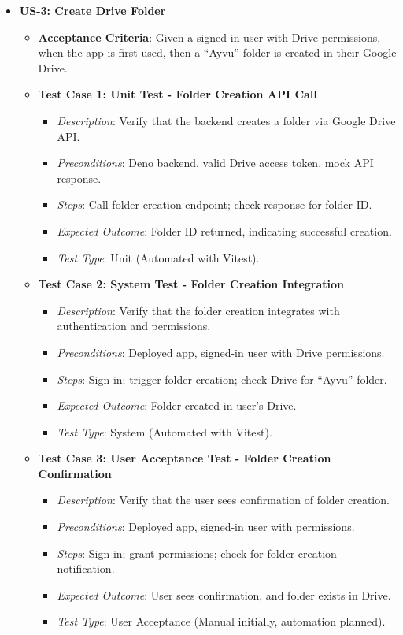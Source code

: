 \documentclass[12pt]{article}
\begin{document}
\begin{itemize}
  \item \textbf{US-3: Create Drive Folder}
    \begin{itemize}
      \item \textbf{Acceptance Criteria}: Given a signed-in user with Drive permissions, when the app is first used, then a ``Ayvu'' folder is created in their Google Drive.
      \item \textbf{Test Case 1: Unit Test - Folder Creation API Call}
        \begin{itemize}
          \item \textit{Description}: Verify that the backend creates a folder via Google Drive API.
          \item \textit{Preconditions}: Deno backend, valid Drive access token, mock API response.
          \item \textit{Steps}: Call folder creation endpoint; check response for folder ID.
          \item \textit{Expected Outcome}: Folder ID returned, indicating successful creation.
          \item \textit{Test Type}: Unit (Automated with Vitest).
        \end{itemize}
      \item \textbf{Test Case 2: System Test - Folder Creation Integration}
        \begin{itemize}
          \item \textit{Description}: Verify that the folder creation integrates with authentication and permissions.
          \item \textit{Preconditions}: Deployed app, signed-in user with Drive permissions.
          \item \textit{Steps}: Sign in; trigger folder creation; check Drive for ``Ayvu'' folder.
          \item \textit{Expected Outcome}: Folder created in user's Drive.
          \item \textit{Test Type}: System (Automated with Vitest).
        \end{itemize}
      \item \textbf{Test Case 3: User Acceptance Test - Folder Creation Confirmation}
        \begin{itemize}
          \item \textit{Description}: Verify that the user sees confirmation of folder creation.
          \item \textit{Preconditions}: Deployed app, signed-in user with permissions.
          \item \textit{Steps}: Sign in; grant permissions; check for folder creation notification.
          \item \textit{Expected Outcome}: User sees confirmation, and folder exists in Drive.
          \item \textit{Test Type}: User Acceptance (Manual initially, automation planned).
        \end{itemize}
    \end{itemize}


\end{itemize}
\end{document}
